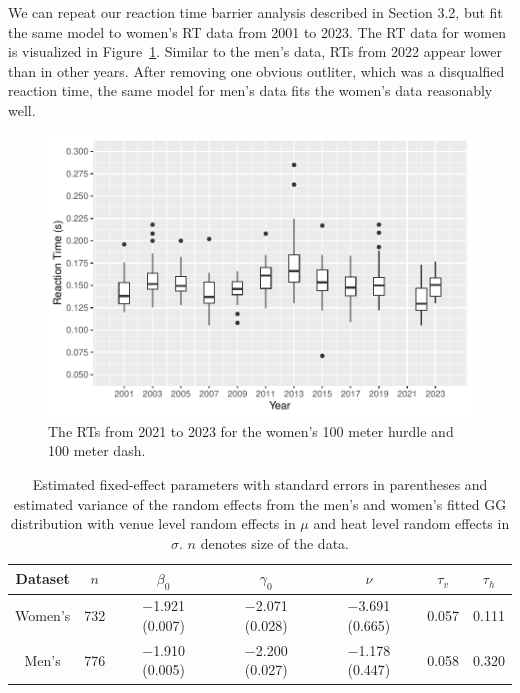 \documentclass[12pt, letterpaper]{article}
\begin{document}
We can repeat our reaction time barrier analysis described in Section 3.2, but
fit the same model to women's RT data from 2001 to 2023.
The RT data for women is visualized in Figure~\ref{fig:WomensBoxplot}.
Similar to the men's data, RTs from 2022 appear lower than in other
years. After removing one obvious outliter, which was a disqualfied
reaction time, the same model for men's data fits the women's data
reasonably well.

\begin{figure}[tbp]
  \centering
  \includegraphics[width=\textwidth]{WomensBoxplot}
  \caption{The RTs from 2021 to 2023 for the women's 100 meter hurdle
  and 100 meter dash.}
  \label{fig:WomensBoxplot}
\end{figure}


\begin{table}
  \centering
  \caption{Estimated fixed-effect parameters with standard errors in
    parentheses and estimated variance of the random effects from the men's and
    women's fitted GG distribution with venue level random
    effects in $\mu$ and heat level random effects in $\sigma$. $n$ denotes
    size of the data.}
  \label{tab:womensfit}
  \begin{tabular}{c c c c c c c}
    \toprule
    Dataset & $n$ & $\beta_0$ & $\gamma_0$ & $\nu$ & $\tau_v$ & $\tau_h$ \\
    \midrule
    Women's & 732 & $-$1.921 (0.007) & $-$2.071 (0.028) & $-$3.691 (0.665) & 0.057 & 0.111 \\
    Men's & 776 & $-$1.910 (0.005) & $-$2.200 (0.027) & $-$1.178 (0.447) & 0.058 & 0.320 \\
    \bottomrule
  \end{tabular}
\end{table}
\end{document}
